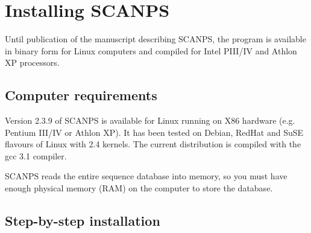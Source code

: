 \documentclass[12pt]{article}
\begin{document}
\section{Installing SCANPS}

Until publication of the manuscript describing SCANPS, the program is
available in binary form for Linux computers and compiled for
Intel PIII/IV and Athlon XP processors.

\subsection{Computer requirements}

Version 2.3.9 of SCANPS is available for Linux running on X86
hardware (e.g. Pentium III/IV or Athlon XP).  It has been tested on
Debian, RedHat and SuSE flavours of Linux with 2.4 kernels.  The
current distribution is compiled with the gcc 3.1 compiler.

SCANPS reads the entire sequence database into memory, so you must
have enough physical memory (RAM) on the computer to store the database.

\subsection{Step-by-step installation}
\end{document}
